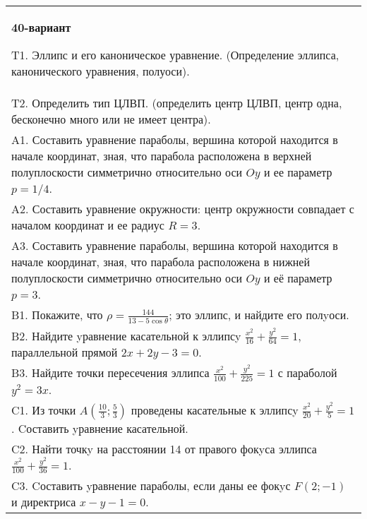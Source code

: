 \documentclass{article}
\begin{document}
\begin{tabular}{m{17cm}}
\textbf{40-вариант}
\newline

T1. Эллипс и его каноническое уравнение. (Определение эллипса, канонического уравнения, полуоси).\\

T2. Определить тип ЦЛВП. (определить центр ЦЛВП, центр одна, бесконечно много или не имеет центра).\\

A1. Составить уравнение параболы, вершина которой находится в начале координат, зная, что парабола расположена в верхней полуплоскости симметрично относительно оси $Oy$ и ее параметр $p=1/4$.\\

A2. Составить уравнение окружности: центр окружности совпадает с началом координат и ее радиус $R=3$.\\

A3. Составить уравнение параболы, вершина которой находится в начале координат, зная, что парабола расположена в нижней полуплоскости симметрично относительно оси $Oy$ и её параметр $p=3$.\\

B1. Покажите, что $\rho = \frac{144}{13 - 5\cos\theta}$; это эллипс, и найдите его полyоси.\\

B2. Найдите yравнение касательной к эллипсy $\frac{x^{2}}{16} + \frac{y^{2}}{64} = 1$, параллельной прямой $2x + 2y - 3 = 0$.  \\

B3. Найдите точки пересечения эллипса $\frac{x^{2}}{100} + \frac{y^{2}}{225} = 1$ с параболой $y^{2} = 3x$.\\

C1. Из точки $A(\frac{10}{3};\frac{5}{3})$ проведены касательные к эллипсy $\frac{x^{2}}{20}+\frac{y^{2}}{5}=1$ . Cоставить yравнение касательной.  \\

C2. Найти точкy на расстоянии 14 от правого фокyса эллипса $\frac{x^{2}}{100}+\frac{y^{2}}{36}=1$.\\

C3. Cоставить yравнение параболы, если даны ее фокyс $F(2;-1)$ и директриса $x-y-1=0$.  \\

\end{tabular}
\vspace{1cm}
\end{document}

